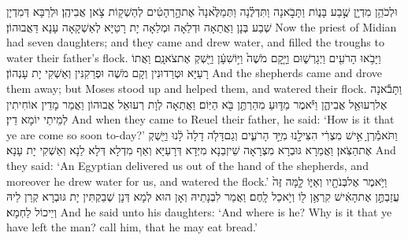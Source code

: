 {וּלְכֹהֵ֥ן מִדְיָ֖ן שֶׁ֣בַע בָּנ֑וֹת וַתָּבֹ֣אנָה וַתִּדְלֶ֗נָה וַתְּמַלֶּ֙אנָה֙ אֶת\maqqaf הָ֣רְהָטִ֔ים לְהַשְׁק֖וֹת צֹ֥אן אֲבִיהֶֽן׃}
{וּלְרַבָּא דְּמִדְיָן שְׁבַע בְּנָן וַאֲתַאָה וּדְלַאָה וּמְלַאָה יָת רָטַיָּא לְאַשְׁקָאָה עָנָא דַּאֲבוּהוֹן׃}
{Now the priest of Midian had seven daughters; and they came and drew water, and filled the troughs to water their father’s flock.}{}
{וַיָּבֹ֥אוּ הָרֹעִ֖ים וַיְגָרְשׁ֑וּם וַיָּ֤קׇם מֹשֶׁה֙ וַיּ֣וֹשִׁעָ֔ן וַיַּ֖שְׁקְ אֶת\maqqaf צֹאנָֽם׃}
{וַאֲתוֹ רָעַיָּא וּטְרַדוּנִין וְקָם מֹשֶׁה וּפְרַקִנִּין וְאַשְׁקִי יָת עָנְהוֹן׃}
{And the shepherds came and drove them away; but Moses stood up and helped them, and watered their flock.}{}
{וַתָּבֹ֕אנָה אֶל\maqqaf רְעוּאֵ֖ל אֲבִיהֶ֑ן וַיֹּ֕אמֶר מַדּ֛וּעַ מִהַרְתֶּ֥ן בֹּ֖א הַיּֽוֹם׃}
{וַאֲתַאָה לְוָת רְעוּאֵל אֲבוּהוֹן וַאֲמַר מָדֵין אוֹחִיתִין לְמֵיתֵי יוֹמָא דֵין׃}
{And when they came to Reuel their father, he said: ‘How is it that ye are come so soon to-day?’}{}
{וַתֹּאמַ֕רְןָ אִ֣ישׁ מִצְרִ֔י הִצִּילָ֖נוּ מִיַּ֣ד הָרֹעִ֑ים וְגַם\maqqaf דָּלֹ֤ה דָלָה֙ לָ֔נוּ וַיַּ֖שְׁקְ אֶת\maqqaf הַצֹּֽאן׃}
{וַאֲמַרָא גּוּבְרָא מִצְרָאָה שֵׁיזְבַנָא מִיְּדָא דְּרָעַיָּא וְאַף מִדְלָא דְּלָא לַנָא וְאַשְׁקִי יָת עָנָא׃}
{And they said: ‘An Egyptian delivered us out of the hand of the shepherds, and moreover he drew water for us, and watered the flock.’}{}
{וַיֹּ֥אמֶר אֶל\maqqaf בְּנֹתָ֖יו וְאַיּ֑וֹ לָ֤מָּה זֶּה֙ עֲזַבְתֶּ֣ן אֶת\maqqaf הָאִ֔ישׁ קִרְאֶ֥ן ל֖וֹ וְיֹ֥אכַל לָֽחֶם׃}
{וַאֲמַר לִבְנָתֵיהּ וְאָן הוּא לְמָא דְּנָן שְׁבַקְתִּין יָת גּוּבְרָא קְרַן לֵיהּ וְיֵיכוֹל לַחְמָא׃}
{And he said unto his daughters: ‘And where is he? Why is it that ye have left the man? call him, that he may eat bread.’}{}
